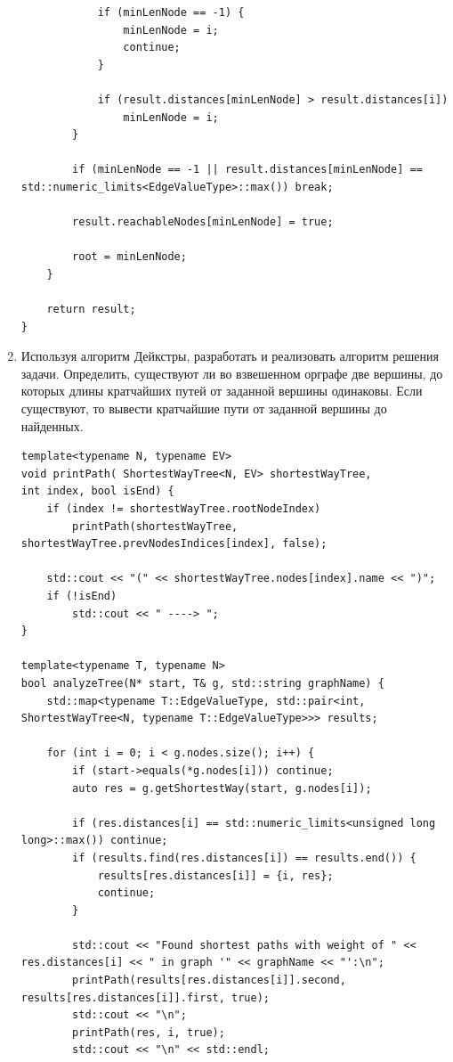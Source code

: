 \documentclass[a4paper,14pt]{extarticle}
\begin{document}
\begin{enumerate}[1.]
\begin{verbatim}
            if (minLenNode == -1) {
                minLenNode = i;
                continue;
            }

            if (result.distances[minLenNode] > result.distances[i])
                minLenNode = i;
        }

        if (minLenNode == -1 || result.distances[minLenNode] == std::numeric_limits<EdgeValueType>::max()) break;

        result.reachableNodes[minLenNode] = true;

        root = minLenNode;
    }  

    return result;
}
        \end{verbatim}
        \item Используя алгоритм Дейкстры, разработать и реализовать алгоритм решения задачи.\bigbreak
        Определить, существуют ли во взвешенном орграфе две вершины, до которых длины 
        кратчайших путей от заданной вершины одинаковы. Если существуют, то вывести 
        кратчайшие пути от заданной вершины до найденных.\\
        \begin{verbatim}
template<typename N, typename EV>
void printPath( ShortestWayTree<N, EV> shortestWayTree, 
int index, bool isEnd) {
    if (index != shortestWayTree.rootNodeIndex)
        printPath(shortestWayTree, shortestWayTree.prevNodesIndices[index], false);

    std::cout << "(" << shortestWayTree.nodes[index].name << ")";
    if (!isEnd)
        std::cout << " ----> ";
}

template<typename T, typename N>
bool analyzeTree(N* start, T& g, std::string graphName) {
    std::map<typename T::EdgeValueType, std::pair<int, ShortestWayTree<N, typename T::EdgeValueType>>> results;
    
    for (int i = 0; i < g.nodes.size(); i++) {
        if (start->equals(*g.nodes[i])) continue;
        auto res = g.getShortestWay(start, g.nodes[i]);

        if (res.distances[i] == std::numeric_limits<unsigned long long>::max()) continue;
        if (results.find(res.distances[i]) == results.end()) {
            results[res.distances[i]] = {i, res};
            continue;
        }

        std::cout << "Found shortest paths with weight of " << res.distances[i] << " in graph '" << graphName << "':\n";
        printPath(results[res.distances[i]].second, results[res.distances[i]].first, true);
        std::cout << "\n";
        printPath(res, i, true);
        std::cout << "\n" << std::endl;


\end{verbatim}
\end{enumerate}
\end{document}
